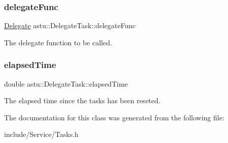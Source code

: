 \subsubsection{\texorpdfstring{delegate\+Func}{delegateFunc}}
{\footnotesize\ttfamily \hyperlink{classastu_1_1DelegateTask_a74c7859178eb0889e884209d1604de4d}{Delegate} astu\+::\+Delegate\+Task\+::delegate\+Func}

The delegate function to be called. \mbox{\label{classastu_1_1DelegateTask_ae192279cf06935c58ad19c28ac674e18}} 
\subsubsection{\texorpdfstring{elapsed\+Time}{elapsedTime}}
{\footnotesize\ttfamily double astu\+::\+Delegate\+Task\+::elapsed\+Time}

The elapsed time since the tasks has been reseted. 

The documentation for this class was generated from the following file\+:\begin{DoxyCompactItemize}
\item 
include/\+Service/Tasks.\+h\end{DoxyCompactItemize}
